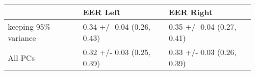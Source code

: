 \begin{tabular}{lll}
\toprule
{} &                    EER Left &                   EER Right \\
\midrule
keeping 95\% variance &  0.34 +/- 0.04 (0.26, 0.43) &  0.35 +/- 0.04 (0.27, 0.41) \\
All PCs              &  0.32 +/- 0.03 (0.25, 0.39) &  0.33 +/- 0.03 (0.26, 0.39) \\
\bottomrule
\end{tabular}
